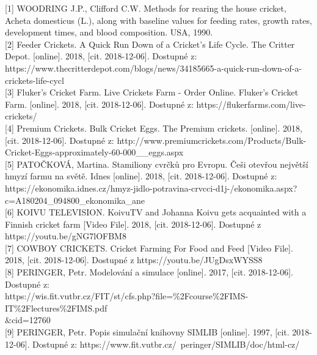 \documentclass[a4paper, 12pt]{extarticle}
\begin{document}
[1] WOODRING J.P., Clifford C.W. Methods for rearing the house cricket, Acheta domesticus (L.), along with baseline values for feeding rates, growth rates, development times, and blood composition. USA, 1990.\\

[2] Feeder Crickets. A Quick Run Down of a Cricket's Life Cycle. The Critter Depot. [online]. 2018, [cit. 2018-12-06]. Dostupné z: https://www.thecritterdepot.com/blogs/news/34185665-a-quick-run-down-of-a-crickets-life-cycl\\

[3] Fluker's Cricket Farm. Live Crickets Farm - Order Online. Fluker's Cricket Farm. [online]. 2018, [cit. 2018-12-06]. Dostupné z: https://flukerfarms.com/live-crickets/ \\

[4] Premium Crickets. Bulk Cricket Eggs. The Premium crickets. [online]. 2018, [cit. 2018-12-06]. Dostupné z: http://www.premiumcrickets.com/Products/Bulk-Cricket-Eggs-approximately-60-000\_\_eggs.aspx \\

[5] PATOČKOVÁ, Martina. Stamiliony cvrčků pro Evropu. Češi otevřou největší hmyzí farmu na světě. Idnes [online]. 2018, [cit. 2018-12-06]. Dostupné z: https://ekonomika.idnes.cz/hmyz-jidlo-potravina-crvcci-d1j-/ekonomika.aspx?c=A180204\_094800\_ekonomika\_ane\\

[6] KOIVU TELEVISION. KoivuTV and Johanna Koivu gets acquainted with a Finnish cricket farm [Video File]. 2018, [cit. 2018-12-06]. Dostupné z https://youtu.be/gNG7lOFBM8\\

[7] COWBOY CRICKETS. Cricket Farming For Food and Feed [Video File]. 2018, [cit. 2018-12-06]. Dostupné z https://youtu.be/JUgDsxWYSS8\\

[8] PERINGER, Petr. Modelování a simulace [online]. 2017, [cit. 2018-12-06]. Dostupné z:\\ https://wis.fit.vutbr.cz/FIT/st/cfs.php?file=\%2Fcourse\%2FIMS-IT\%2Flectures\%2FIMS.pdf\\\&cid=12760 \\

[9] PERINGER, Petr. Popis simulační knihovny SIMLIB [online]. 1997, [cit. 2018-12-06]. Dostupné z: https://www.fit.vutbr.cz/~peringer/SIMLIB/doc/html-cz/
\end{document}
